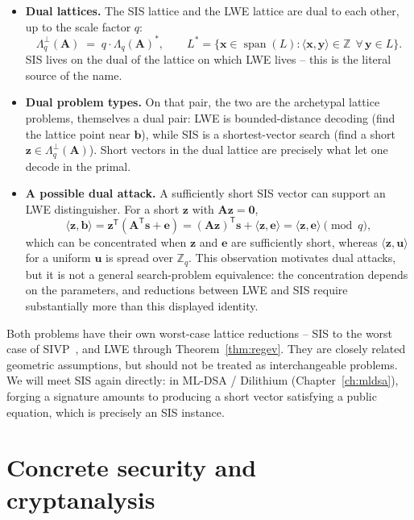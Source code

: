 \begin{itemize}
  \item \textbf{Dual lattices.} The SIS lattice and the LWE lattice are dual to each other, up to the scale factor $q$:
  \[
  \Lambda_q^{\perp}(\mathbf{A}) \;=\; q\cdot\Lambda_q(\mathbf{A})^{*},
  \qquad
  L^{*}=\{\mathbf{x}\in\operatorname{span}(L):\langle\mathbf{x},\mathbf{y}\rangle\in\mathbb{Z}\ \ \forall\,\mathbf{y}\in L\}.
  \]
  SIS lives on the dual of the lattice on which LWE lives -- this is the literal source of the name.
  \item \textbf{Dual problem types.} On that pair, the two are the archetypal lattice problems, themselves a dual pair: LWE is bounded-distance decoding (find the lattice point near $\mathbf{b}$), while SIS is a shortest-vector search (find a short $\mathbf{z}\in\Lambda_q^{\perp}(\mathbf{A})$). Short vectors in the dual lattice are precisely what let one decode in the primal.
  \item \textbf{A possible dual attack.} A sufficiently short SIS vector can support an LWE distinguisher. For a short $\mathbf{z}$ with $\mathbf{A}\mathbf{z}=\mathbf{0}$,
  \[
  \langle \mathbf{z},\mathbf{b}\rangle
  = \mathbf{z}^{\mathsf T}\!\left(\mathbf{A}^{\mathsf T}\mathbf{s}+\mathbf{e}\right)
  = (\mathbf{A}\mathbf{z})^{\mathsf T}\mathbf{s} + \langle \mathbf{z},\mathbf{e}\rangle
  = \langle \mathbf{z},\mathbf{e}\rangle \pmod q,
  \]
  which can be concentrated when $\mathbf{z}$ and $\mathbf{e}$ are sufficiently short, whereas $\langle\mathbf{z},\mathbf{u}\rangle$ for a uniform $\mathbf{u}$ is spread over $\mathbb{Z}_q$. This observation motivates dual attacks, but it is not a general search-problem equivalence: the concentration depends on the parameters, and reductions between LWE and SIS require substantially more than this displayed identity.
\end{itemize}

Both problems have their own worst-case lattice reductions -- SIS to the worst case of SIVP~\cite{ajtai1996}, and LWE through Theorem~\ref{thm:regev}. They are closely related geometric assumptions, but should not be treated as interchangeable problems. We will meet SIS again directly: in ML-DSA / Dilithium (Chapter~\ref{ch:mldsa}), forging a signature amounts to producing a short vector satisfying a public equation, which is precisely an SIS instance.

\section{Concrete security and cryptanalysis}
\label{sec:lwe-cryptanalysis}

